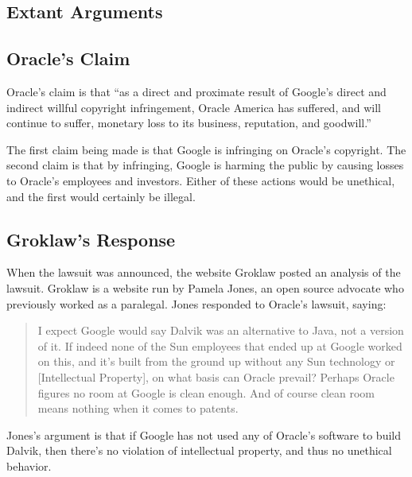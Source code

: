 \documentclass[11pt]{article}
\begin{document}
\begin{multicols}{2}

\section{Extant Arguments} %
\label{sec:args}

\subsection{Oracle's Claim} %
\label{sub:args_oracle}

Oracle's claim is that ``as a direct and proximate result of Google's direct
and indirect willful copyright infringement, Oracle America has suffered, and
will continue to suffer, monetary loss to its business, reputation, and
goodwill.'' \cite[p.~9 line 11]{oracle-lawsuit}

The first claim being made is that Google is infringing on Oracle's copyright.
The second claim is that by infringing, Google is harming the public by causing
losses to Oracle's employees and investors.  Either of these actions would be
unethical, and the first would certainly be illegal.



\subsection{Groklaw's Response} %
\label{sub:args_groklaw}

When the lawsuit was announced, the website Groklaw posted an analysis of the
lawsuit.  Groklaw is a website run by Pamela Jones, an open source advocate who
previously worked as a paralegal. \cite{groklaw-pj} Jones responded to Oracle's
lawsuit, saying: \cite{groklaw}

\begin{quotation}
I expect Google would say Dalvik was an alternative to Java, not a version of
it. If indeed none of the Sun employees that ended up at Google worked on this,
and it's built from the ground up without any Sun technology or [Intellectual
Property], on what basis can Oracle prevail? Perhaps Oracle figures no room at
Google is clean enough. And of course clean room means nothing when it comes to
patents.
\end{quotation}

Jones's argument is that if Google has not used any of Oracle's software to
build Dalvik, then there's no violation of intellectual property, and thus no
unethical behavior.


\end{multicols}
\end{document}
